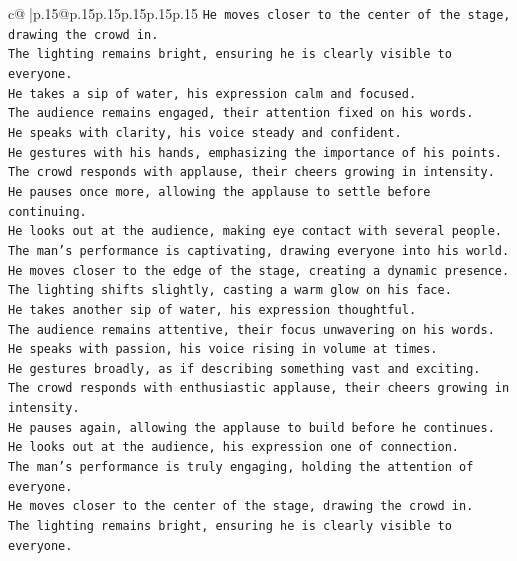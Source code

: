 \documentclass{article}
\begin{document}
{\begin{supertabular}{c@{$\;$}|p{.15\linewidth}@{}p{.15\linewidth}p{.15\linewidth}p{.15\linewidth}p{.15\linewidth}p{.15\linewidth}}
{{{\texttt{He moves closer to the center of the stage, drawing the crowd in.  } \\
\texttt{The lighting remains bright, ensuring he is clearly visible to everyone.  } \\
\texttt{He takes a sip of water, his expression calm and focused.  } \\
\texttt{The audience remains engaged, their attention fixed on his words.  } \\
\texttt{He speaks with clarity, his voice steady and confident.  } \\
\texttt{He gestures with his hands, emphasizing the importance of his points.  } \\
\texttt{The crowd responds with applause, their cheers growing in intensity.  } \\
\texttt{He pauses once more, allowing the applause to settle before continuing.  } \\
\texttt{He looks out at the audience, making eye contact with several people.  } \\
\texttt{The man's performance is captivating, drawing everyone into his world.  } \\
\texttt{He moves closer to the edge of the stage, creating a dynamic presence.  } \\
\texttt{The lighting shifts slightly, casting a warm glow on his face.  } \\
\texttt{He takes another sip of water, his expression thoughtful.  } \\
\texttt{The audience remains attentive, their focus unwavering on his words.  } \\
\texttt{He speaks with passion, his voice rising in volume at times.  } \\
\texttt{He gestures broadly, as if describing something vast and exciting.  } \\
\texttt{The crowd responds with enthusiastic applause, their cheers growing in intensity.  } \\
\texttt{He pauses again, allowing the applause to build before he continues.  } \\
\texttt{He looks out at the audience, his expression one of connection.  } \\
\texttt{The man's performance is truly engaging, holding the attention of everyone.  } \\
\texttt{He moves closer to the center of the stage, drawing the crowd in.  } \\
\texttt{The lighting remains bright, ensuring he is clearly visible to everyone.  } \\
}}}
\end{supertabular}}
\end{document}
